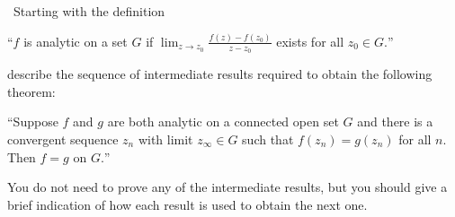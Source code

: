 \documentclass[12pt]{Homework}
\begin{document}
\begin{problem} $\,$
Starting with the definition 

``$f$ is analytic on a set $G$ if $\lim_{z\to z_0}\frac{f(z)-f(z_0)}{z-z_0}$ exists for all $z_0\in G.$'' 

describe the sequence of intermediate results required to obtain the following theorem: 

``Suppose $f$ and $g$ are both analytic on a connected open set $G$ and there is a convergent sequence $z_n$ with limit $z_\infty\in G$ such that $f(z_n)=g(z_n)$ for all $n.$ Then $f=g$ on $G.$''

You do not need to prove any of the intermediate results, but you should give a brief indication of how each result is used to obtain the next one.
\end{problem}
\end{document}
